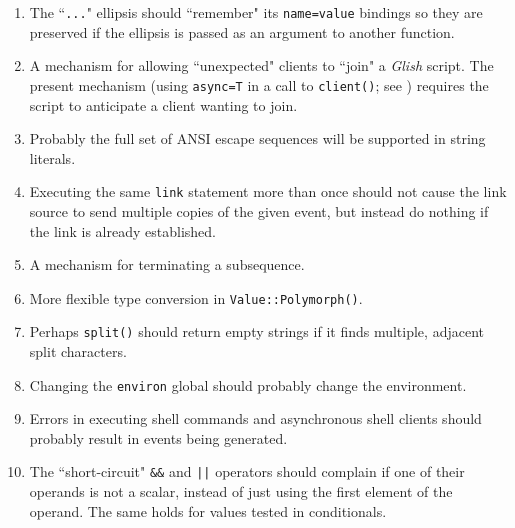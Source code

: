 \begin{enumerate}
\item The ``{\tt ...}" ellipsis should ``remember" its {\tt name=value}
bindings so they are preserved if the ellipsis is passed as an argument
to another function.

\item A mechanism
for allowing ``unexpected" clients to ``join" a
{\em Glish} script.  The present mechanism (using {\tt async=T} in a call
to {\tt client()}; see ) requires the script to
anticipate a client wanting to join.

\item Probably the full set of ANSI escape sequences will be
supported in string literals.

\item Executing the same {\tt link} statement more than once should
not cause the link source to send multiple copies of the given event,
but instead do nothing if the link is already established.

\item A mechanism for terminating a subsequence.

\item More flexible type conversion in {\tt Value::Polymorph()}.

\item Perhaps {\tt split()} should return empty strings if it finds multiple,
adjacent split characters.

\item Changing the {\tt environ} global should probably change the environment.

\item Errors in executing shell commands and asynchronous shell clients
should probably result in events being generated.

\item The ``short-circuit" {\tt \&\&} and \verb+||+ operators should
complain if one of their operands is not a scalar, instead of just
using the first element of the operand.  The same holds for values
tested in conditionals.

\end{enumerate}


